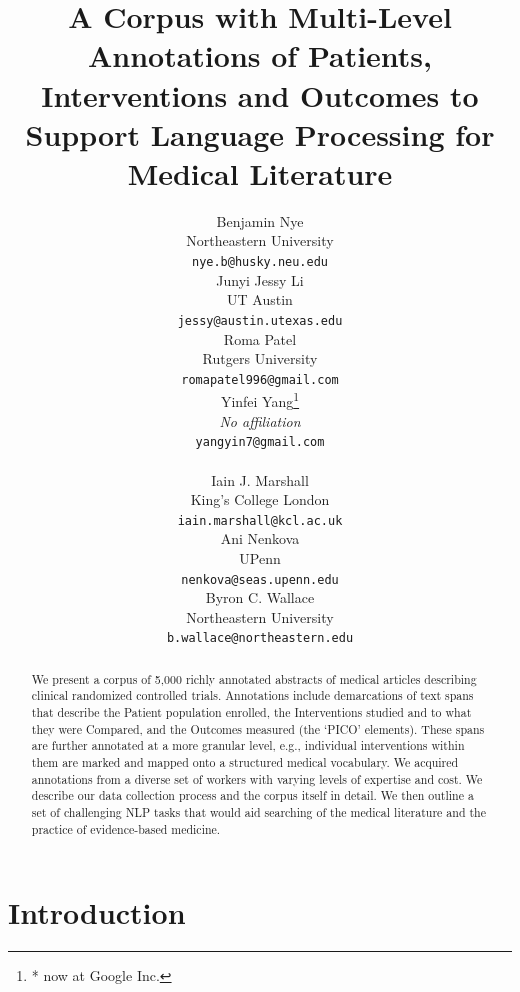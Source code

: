 \documentclass[11pt,a4paper]{article}
\title{A Corpus with Multi-Level Annotations of Patients, Interventions and Outcomes to Support Language Processing for Medical Literature}
\author{Benjamin Nye \\
  Northeastern University \\
  {\small\tt nye.b@husky.neu.edu}  \\\And 
  Junyi Jessy Li \\ 
  UT Austin \\ 
  {\small\tt jessy@austin.utexas.edu} \\\And
  Roma Patel \\
  Rutgers University\\
  {\small\tt romapatel996@gmail.com} \\\AND
  Yinfei Yang\thanks{* now at Google Inc.} \\
  \emph{No affiliation} \\
  {\small\tt yangyin7@gmail.com} \\ \\\And 
  Iain J. Marshall \\
  King's College London \\
  {\small\tt iain.marshall@kcl.ac.uk} \\\And
  Ani Nenkova \\
  UPenn \\
  {\small\tt nenkova@seas.upenn.edu} \\\AND
  Byron C. Wallace \\
  Northeastern University \\
  {\small\tt b.wallace@northeastern.edu}}
\date{}
\begin{document}
\maketitle
\begin{abstract}

We present a corpus of 5,000 richly annotated abstracts of medical articles describing %
clinical randomized controlled trials. Annotations include demarcations of text spans that describe the Patient population enrolled, the Interventions studied and to what they were Compared, and the Outcomes measured (the `PICO' elements). These spans are further annotated at a more granular level, e.g., individual interventions within them are marked and mapped onto a structured medical vocabulary. We acquired annotations from a diverse set of workers with varying levels of expertise and cost. We describe our data collection process and the corpus itself in detail. We then outline a set of challenging NLP tasks that would aid searching of the medical literature and the practice of evidence-based medicine. 
\end{abstract}

\section{Introduction}
\label{section:intro}
 
\end{document}
